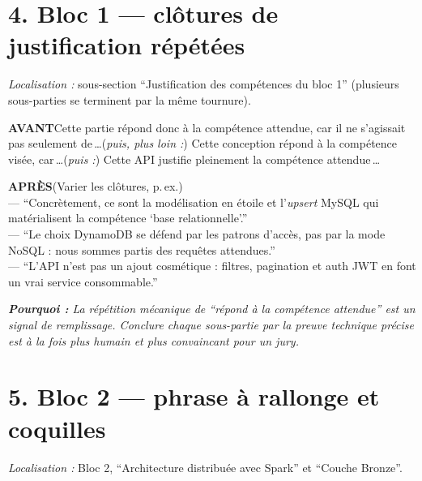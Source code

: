 \documentclass[11pt,a4paper]{article}
\newcommand{\av}{\textbf{\textcolor{avant}{AVANT}}\quad}
\newcommand{\ap}{\textbf{\textcolor{apres}{APRÈS}}\quad}
\newcommand{\pourquoi}[1]{\par\smallskip\noindent\textit{\textbf{Pourquoi :} #1}\par\smallskip}
\begin{document}
\section*{4. Bloc 1 --- clôtures de justification répétées}
\noindent\textit{Localisation :} sous-section \enquote{Justification des compétences du bloc 1}
(plusieurs sous-parties se terminent par la même tournure).

\begin{avantbox}
\av Cette partie répond donc à la compétence attendue, car il ne s'agissait pas seulement
de\,\dots\quad(\textit{puis, plus loin :}) Cette conception répond à la compétence visée,
car\,\dots\quad(\textit{puis :}) Cette API justifie pleinement la compétence attendue\,\dots
\end{avantbox}
\begin{apresbox}
\ap (Varier les clôtures, p.\,ex.)\\
--- \enquote{Concrètement, ce sont la modélisation en étoile et l'\textit{upsert} MySQL qui
matérialisent la compétence \enquote{base relationnelle}.}\\
--- \enquote{Le choix DynamoDB se défend par les patrons d'accès, pas par la mode NoSQL :
nous sommes partis des requêtes attendues.}\\
--- \enquote{L'API n'est pas un ajout cosmétique : filtres, pagination et auth JWT en font
un vrai service consommable.}
\end{apresbox}
\pourquoi{La répétition mécanique de \enquote{répond à la compétence attendue} est un
signal de remplissage. Conclure chaque sous-partie par la \emph{preuve technique précise}
est à la fois plus humain et plus convaincant pour un jury.}

\section*{5. Bloc 2 --- phrase à rallonge et coquilles}
\noindent\textit{Localisation :} Bloc 2, \enquote{Architecture distribuée avec Spark} et
\enquote{Couche Bronze}.
\end{document}
